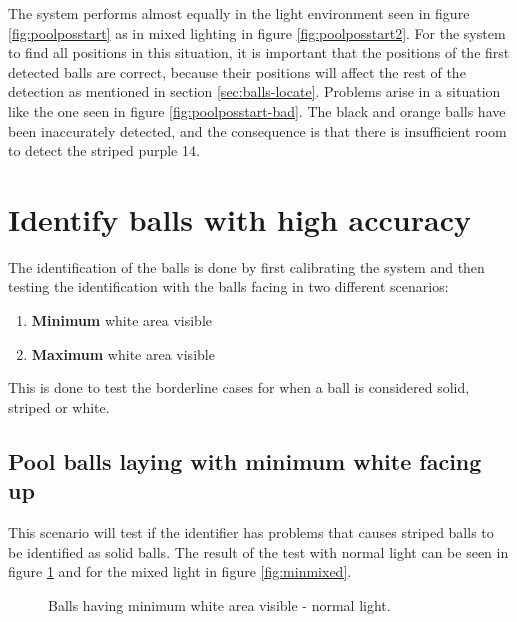 The system performs almost equally in the light environment seen in figure \ref{fig:poolposstart} as in mixed lighting in figure \ref{fig:poolposstart2}. For the system to find all positions in this situation, it is important that the positions of the first detected balls are correct, because their positions will affect the rest of the detection as mentioned in section \ref{sec:balls-locate}. Problems arise in a situation like the one seen in figure \ref{fig:poolposstart-bad}. The black and orange balls have been inaccurately detected, and the consequence is that there is insufficient room to detect the striped purple 14.


\section{Identify balls with high accuracy}
The identification of the balls is done by first calibrating the system and then testing the identification with the balls facing in two different scenarios:

\begin{enumerate}
\setlength{\itemsep}{0mm}
	\item \textbf{Minimum} white area visible
	\item \textbf{Maximum} white area visible
\end{enumerate}
This is done to test the borderline cases for when a ball is considered solid, striped or white.

\subsection{Pool balls laying with minimum white facing up}
This scenario will test if the identifier has problems that causes striped balls to be identified as solid balls.
The result of the test with normal light can be seen in figure \ref{fig:minnormal} and for the mixed light in figure \ref{fig:minmixed}.
\begin{figure}[htpb]
  \centering
  \quad
	\quad
   \caption{Balls having minimum white area visible - normal light.}
  \label{fig:minnormal}
\end{figure}

